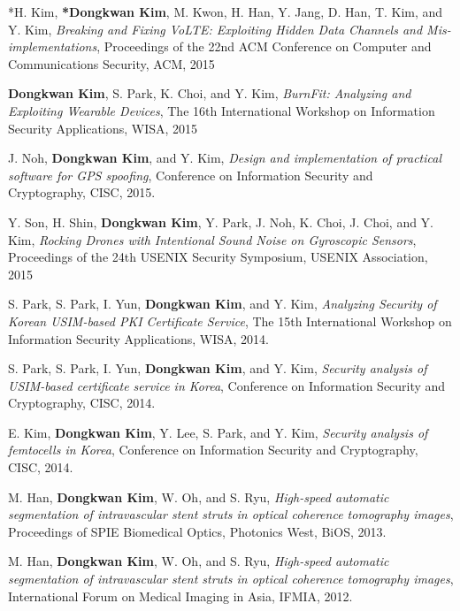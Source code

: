   \begin{publication}
    \item
    *H. Kim, \textbf{*Dongkwan Kim}, M. Kwon, H. Han, Y. Jang, D. Han, T. Kim,
    and Y. Kim,
    \emph{Breaking and Fixing VoLTE: Exploiting Hidden Data Channels and
    Mis-implementations},
    Proceedings of the 22nd ACM Conference on Computer and Communications
    Security,
    ACM,
    2015

    \item
    \textbf{Dongkwan Kim}, S. Park, K. Choi, and Y. Kim,
    \emph{BurnFit: Analyzing and Exploiting Wearable Devices},
    The 16th International Workshop on Information Security Applications,
    WISA,
    2015

    \item
    J. Noh, \textbf{Dongkwan Kim}, and Y. Kim,
    \emph{Design and implementation of practical software for GPS spoofing},
    Conference on Information Security and Cryptography,
    CISC,
    2015.

    \item
    Y. Son, H. Shin, \textbf{Dongkwan Kim}, Y. Park, J. Noh, K. Choi, J. Choi,
    and Y. Kim,
    \emph{Rocking Drones with Intentional Sound Noise on Gyroscopic Sensors},
    Proceedings of the 24th USENIX Security Symposium,
    USENIX Association,
    2015


    \item
    S. Park, S. Park, I. Yun, \textbf{Dongkwan Kim}, and Y. Kim,
    \emph{Analyzing Security of Korean USIM-based PKI Certificate Service},
    The 15th International Workshop on Information Security Applications,
    WISA,
    2014.

    \item
    S. Park, S. Park, I. Yun, \textbf{Dongkwan Kim}, and Y. Kim,
    \emph{Security analysis of USIM-based certificate service in Korea},
    Conference on Information Security and Cryptography,
    CISC,
    2014.

    \item
    E. Kim, \textbf{Dongkwan Kim}, Y. Lee, S. Park, and Y. Kim,
    \emph{Security analysis of femtocells in Korea},
    Conference on Information Security and Cryptography,
    CISC,
    2014.

    \item
    M. Han, \textbf{Dongkwan Kim}, W. Oh, and S. Ryu,
    \emph{High-speed automatic segmentation of intravascular stent struts in
    optical coherence tomography images},
    Proceedings of SPIE Biomedical Optics, Photonics West,
    BiOS,
    2013.

    \item
    M. Han, \textbf{Dongkwan Kim}, W. Oh, and S. Ryu,
    \emph{High-speed automatic segmentation of intravascular stent struts in
    optical coherence tomography images},
    International Forum on Medical Imaging in Asia,
    IFMIA,
    2012.

  \end{publication}
